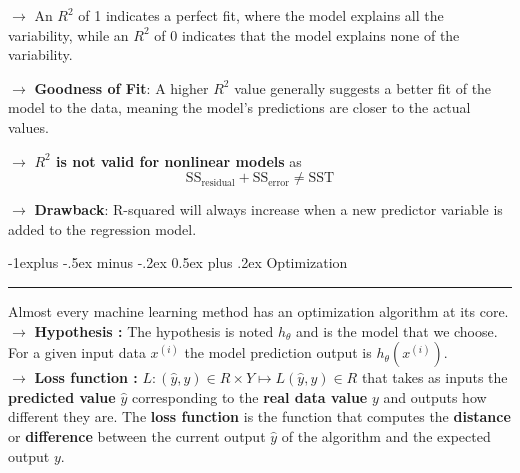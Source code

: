 \documentclass[letterpaper, 10.5pt,landscape]{article}
\makeatletter
\renewcommand{\subsection}{\@startsection{subsection}{2}{0mm}%
                                {-1explus -.5ex minus -.2ex}%
                                {0.5ex plus .2ex}%
                                {\normalfont\normalsize\bfseries}}
\makeatother
\begin{document}
\begin{multicols*}{3}
$\rightarrow$ An $R^{2}$ of 1 indicates a perfect fit, where the model explains all the variability, while an $R^{2}$ of 0 indicates that the model explains none of the variability.

$\rightarrow$ \textbf{Goodness of Fit}: A higher $R^{2}$
value generally suggests a better fit of the model to the data, meaning the model's predictions are closer to the actual values. 


$\rightarrow$ \textbf{$R^{2}$ is not valid for nonlinear models} as 
\vspace{-3pt}
\[\boxed{\text{SS}_{\text{residual}} + \text{SS}_{\text{error}} \neq \text{SST}}\]
\vspace{-3pt}

$\rightarrow$ \textbf{Drawback}: R-squared will always increase when a new predictor variable is added to the regression model.  












\subsection{Optimization} {\color{teal}\hrule height 0.5pt} \smallskip

Almost every machine learning method has an optimization algorithm at its core. \\
$\rightarrow$ \textbf{Hypothesis : } The hypothesis is noted $h_{\theta}$ and is the model that we choose. For a given input data $x^{(i)}$ the model prediction output is $\boxed{h_{\theta}(x^{(i)})}$. \\
$\rightarrow$ \textbf{Loss function : } 
\(\boxed{L:(\hat{y},y)  \in  R \times Y \longmapsto  L(\hat{y},y) \in R} \) that takes as inputs the \textbf{predicted value} $\hat{y}$ corresponding to the \textbf{real data value} $y$ and outputs how different they are. The \textbf{loss function} is the function that computes the \textbf{distance} or \textbf{difference} between the current output $\hat{y}$ of the algorithm and the expected output $y$. 


\end{multicols*}
\end{document}
